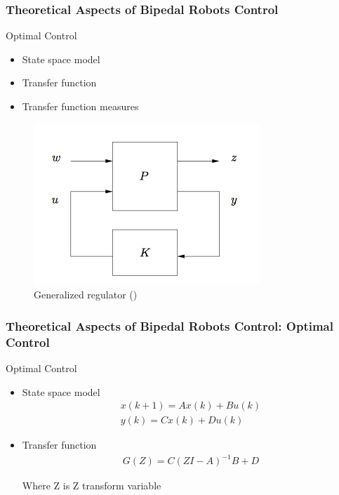 \documentclass{beamer}
\begin{document}
	\begin{frame}
		\frametitle{Theoretical Aspects of Bipedal Robots Control}
		\begin{block}{Optimal Control}
			\begin{itemize}
				\item
					State space model
				\item
					Transfer function
				\item
					Transfer function measures
			\end{itemize}
		\end{block}
		
		\begin{figure}[h!]
			\includegraphics[width=0.5\linewidth]{presentation_images/15}
			\caption{Generalized regulator (\cite{hazell2008discrete})}
		\end{figure}
	\end{frame}


	\begin{frame}
		\frametitle{Theoretical Aspects of Bipedal Robots Control: Optimal Control}
		\begin{block}{Optimal Control}
			\begin{itemize}
				\item
					State space model
					\begin{equation}
						\begin{split}
							x(k+1) = Ax(k) + Bu(k)\\
							y(k) = Cx(k) + Du(k)
						\end{split}
					\end{equation}
				\item
					Transfer function
					\begin{equation}
						\begin{split}
							G(Z) = C(ZI - A)^{-1} B + D
						\end{split}
					\end{equation}
					
					Where Z is Z transform variable
			\end{itemize}
		\end{block}
	\end{frame}
	
\end{document}

